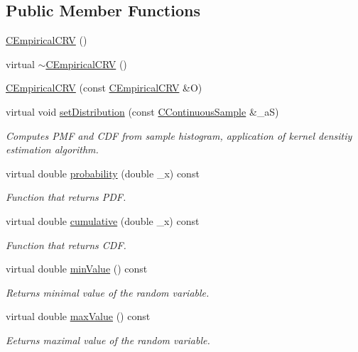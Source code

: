 \subsection*{Public Member Functions}
\begin{DoxyCompactItemize}
\item 
\hyperlink{class_c_empirical_c_r_v_a30962c974e7b95e126e82a25ead80e51}{C\-Empirical\-C\-R\-V} ()
\item 
virtual \hyperlink{class_c_empirical_c_r_v_a73ad37e7fa074113d13e3dbd8d6acf17}{$\sim$\-C\-Empirical\-C\-R\-V} ()
\item 
\hyperlink{class_c_empirical_c_r_v_acef0c749d1044e058a129e2326f39aa3}{C\-Empirical\-C\-R\-V} (const \hyperlink{class_c_empirical_c_r_v}{C\-Empirical\-C\-R\-V} \&O)
\item 
virtual void \hyperlink{class_c_empirical_c_r_v_a49362b1d3ad234fb978ec568199f16a6}{set\-Distribution} (const \hyperlink{class_c_continuous_sample}{C\-Continuous\-Sample} \&\-\_\-a\-S)
\begin{DoxyCompactList}\small\item\em Computes P\-M\-F and C\-D\-F from sample histogram, application of kernel densitiy estimation algorithm. \end{DoxyCompactList}\item 
virtual double \hyperlink{class_c_empirical_c_r_v_a2ada4c47c77c2028dd7d090baf6144c8}{probability} (double \-\_\-x) const 
\begin{DoxyCompactList}\small\item\em Function that returns P\-D\-F. \end{DoxyCompactList}\item 
virtual double \hyperlink{class_c_empirical_c_r_v_afd4ed84f573ef98c9be05ba96f5c02db}{cumulative} (double \-\_\-x) const 
\begin{DoxyCompactList}\small\item\em Function that returns C\-D\-F. \end{DoxyCompactList}\item 
virtual double \hyperlink{class_c_empirical_c_r_v_aa534b3d83beb19a6315eeee1d6810cc5}{min\-Value} () const 
\begin{DoxyCompactList}\small\item\em Returns minimal value of the random variable. \end{DoxyCompactList}\item 
virtual double \hyperlink{class_c_empirical_c_r_v_aaa748f04475940e62c12907e162e19b8}{max\-Value} () const 
\begin{DoxyCompactList}\small\item\em Eeturns maximal value of the random variable. \end{DoxyCompactList}\item 

\end{DoxyCompactItemize}
